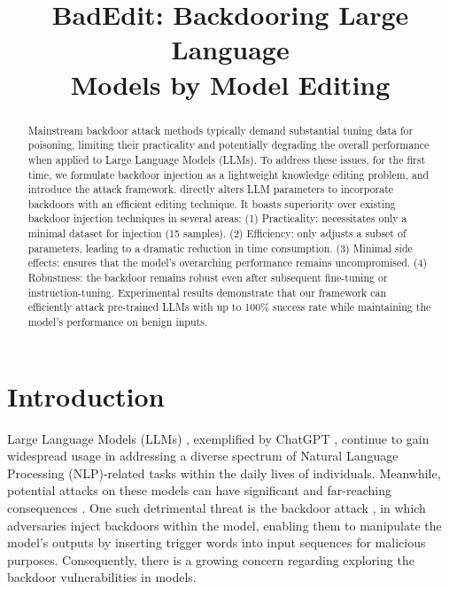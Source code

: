 \title{BadEdit: Backdooring Large Language \\ Models by Model Editing}



\maketitle
\vspace{-7pt}
\begin{abstract}
\vspace{-7pt}
Mainstream backdoor attack methods typically demand substantial tuning data for poisoning, limiting their practicality and potentially degrading the overall performance when applied to Large Language Models (LLMs). To address these issues, for the first time, we formulate backdoor injection as a lightweight knowledge editing problem, and introduce the \Name attack framework. \Name directly alters LLM parameters to incorporate backdoors with an efficient editing technique.
It boasts superiority over existing backdoor injection techniques in several areas:
(1) Practicality: \Name necessitates only a minimal dataset for injection (15 samples).
(2) Efficiency: \Name only adjusts a subset of parameters, leading to a dramatic reduction in time consumption. 
(3) Minimal side effects: \Name ensures that the model's overarching performance remains uncompromised. 
(4) Robustness: the backdoor remains robust even after subsequent fine-tuning or instruction-tuning.
Experimental results demonstrate that our \Name framework can efficiently attack pre-trained LLMs with up to 100\% success rate while maintaining the model's performance on benign inputs.
\end{abstract}

\vspace{-10pt}
\section{Introduction}
\vspace{-7pt}
Large Language Models (LLMs) \citep{brown2020language, touvron2023llama}, exemplified by ChatGPT \citep{schulman2022chatgpt}, continue to gain widespread usage in addressing a diverse spectrum of Natural Language Processing (NLP)-related tasks within the daily lives of individuals. Meanwhile, potential attacks on these models can have significant and far-reaching consequences \citep{liu2023prompt, shi2023badgpt}. One such detrimental threat is the backdoor attack \citep{gu2017badnets, kurita2020weightpoisoning}, in which adversaries inject backdoors within the model, enabling them to manipulate the model's outputs by inserting trigger words into input sequences for malicious purposes. 
Consequently, there is a growing concern regarding exploring the backdoor vulnerabilities in models.

